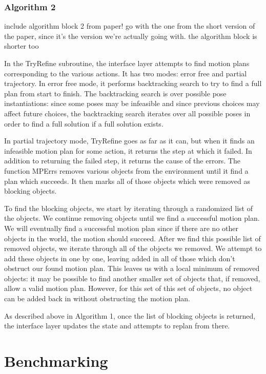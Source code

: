 \documentclass[12pt]{article}
\begin{document}
\subsubsection{Algorithm 2}

include algorithm block 2 from paper!  go with the one from the short version of the paper, since it's the version we're actually going with.  the algorithm block is shorter too

In the TryRefine subroutine, the interface layer attempts to find motion plans corresponding to the various actions.  
It has two modes: error free and partial trajectory.  
In error free mode, it performs backtracking search to try to find a full plan from start to finish.  
The backtracking search is over possible pose instantiations: since some poses may be infeasible and since previous choices may affect future choices, the backtracking search iterates over all possible poses in order to find a full solution if a full solution exists.  

In partial trajectory mode, TryRefine goes as far as it can, but when it finds an infeasible motion plan for some action, it returns the step at which it failed.  
In addition to returning the failed step, it returns the cause of the errors.  
The function MPErrs removes various objects from the environment until it find a plan which succeeds.  
It then marks all of those objects which were removed as blocking objects.

To find the blocking objects, we start by iterating through a randomized list of the objects.  We continue removing objects until we find a successful motion plan.  
We will eventually find a successful motion plan since if there are no other objects in the world, the motion should succeed.  
After we find this possible list of removed objects, we iterate through all of the objects we removed.  
We attempt to add these objects in one by one, leaving added in all of those which don't obstruct our found motion plan.  
This leaves us with a local minimum of removed objects: it may be possible to find another smaller set of objects that, if removed, allow a valid motion plan.  
However, for this set of this set of objects, no object can be added back in without obstructing the motion plan.

As described above in Algorithm 1, once the list of blocking objects is returned, the interface layer updates the state and attempts to replan from there.




\section{Benchmarking}
\end{document}
